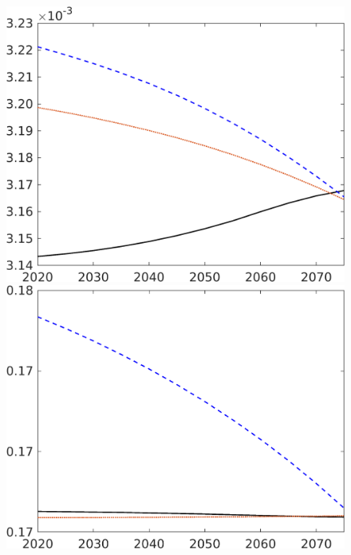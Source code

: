\begin{figure}[h!!]
\begin{minipage}[]{0.32\textwidth}
	\end{minipage}
	\begin{minipage}[]{0.32\textwidth}
		\includegraphics[width=1\textwidth]{../../codding_model/own_basedOnFried/optimalPol_elastS_DisuSci/figures/all_1705/Lf_CompEffOPT_NOT_NoTaus_spillover0_sep1_BN0_ineq0_red0_etaa0.79_lgd0.png}
	\end{minipage}
	\begin{minipage}[]{0.32\textwidth}
		\includegraphics[width=1\textwidth]{../../codding_model/own_basedOnFried/optimalPol_elastS_DisuSci/figures/all_1705/Ln_CompEffOPT_NOT_NoTaus_spillover0_sep1_BN0_ineq0_red0_etaa0.79_lgd0.png}

\end{minipage}
\end{figure}
